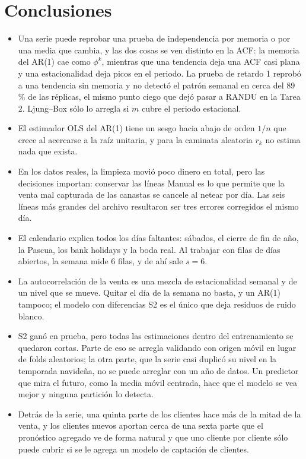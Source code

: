 \documentclass[11pt,letterpaper]{article}
\begin{document}
\newpage
\section{Conclusiones}

\begin{itemize}[leftmargin=1.2em]
\item Una serie puede reprobar una prueba de independencia por memoria o por
una media que cambia, y las dos cosas se ven distinto en la ACF: la memoria
del AR(1) cae como $\phi^k$, mientras que una tendencia deja una ACF casi
plana y una estacionalidad deja picos en el periodo. La prueba de retardo 1
reprobó a una tendencia sin memoria y no detectó el patrón semanal en cerca
del 89\,\% de las réplicas, el mismo punto ciego que dejó pasar a RANDU en la
Tarea 2. Ljung--Box sólo lo
arregla si $m$ cubre el periodo estacional.
\item El estimador OLS del AR(1) tiene un sesgo hacia abajo de orden $1/n$
que crece al acercarse a la raíz unitaria, y para la caminata aleatoria
$r_k$ no estima nada que exista.
\item En los datos reales, la limpieza movió poco dinero en total, pero las
decisiones importan: conservar las líneas Manual es lo que permite que la
venta mal capturada de las canastas se cancele al netear por día. Las seis
líneas más grandes del archivo resultaron ser tres errores corregidos el
mismo día.
\item El calendario explica todos los días faltantes: sábados, el cierre de
fin de año, la Pascua, los bank holidays y la boda real. Al trabajar con
filas de días abiertos, la semana mide 6 filas, y de ahí sale $s=6$.
\item La autocorrelación de la venta es una mezcla de estacionalidad semanal
y de un nivel que se mueve. Quitar el día de la semana no basta, y un AR(1)
tampoco; el modelo con diferencias S2 es el único que deja residuos de ruido
blanco.
\item S2 ganó en prueba, pero todas las estimaciones dentro del entrenamiento
se quedaron cortas. Parte de eso se arregla validando con origen móvil en
lugar de folds aleatorios; la otra parte, que la serie casi duplicó su nivel
en la temporada navideña, no se puede arreglar con un año de datos. Un
predictor que mira el futuro, como la media móvil centrada, hace que el
modelo se vea mejor y ninguna partición lo detecta.
\item Detrás de la serie, una quinta parte de los clientes hace más de la
mitad de la venta, y los clientes nuevos aportan cerca de una sexta parte
que el pronóstico agregado ve de forma natural y que uno cliente por cliente
sólo puede cubrir si se le agrega un modelo de captación de clientes.
\end{itemize}
\end{document}
